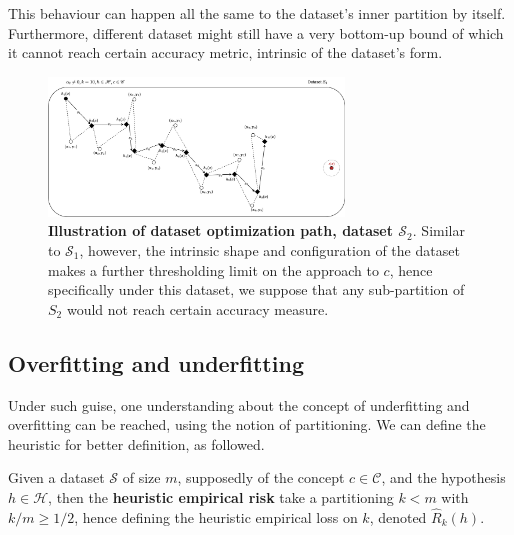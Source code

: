 \documentclass{article}
\begin{document}
This behaviour can happen all the same to the dataset's inner partition by itself. Furthermore, different dataset might still have a very bottom-up bound of which it cannot reach certain accuracy metric, intrinsic of the dataset's form. 
\begin{figure}[htb]
  \centering
  \includegraphics[width=0.7\textwidth]{illustration_descent_algorithm2.png}
  \caption{\textbf{Illustration of dataset optimization path, dataset $\mathcal{S}_{2}$}. Similar to $\mathcal{S}_1$, however, the intrinsic shape and configuration of the dataset makes a further thresholding limit on the approach to $c$, hence specifically under this dataset, we suppose that any sub-partition of $S_{2}$ would not reach certain accuracy measure.}
\end{figure}
\subsection{Overfitting and underfitting}
Under such guise, one understanding about the concept of underfitting and overfitting \cite{gareth_james_introduction_2013} can be reached, using the notion of partitioning. We can define the heuristic for better definition, as followed. 

\begin{definition}
  Given a dataset $\mathcal{S}$ of size $m$, supposedly of the concept $c\in \mathcal{C}$, and the hypothesis $h\in \mathcal{H}$, then the \textbf{heuristic empirical risk} take a partitioning $k<m$ with $k/m\geq 1/2$, hence defining the heuristic empirical loss on $k$, denoted $\hat{R}_{k}(h)$. 
\end{definition}
\end{document}
